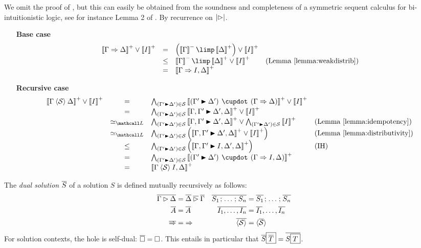 We omit the proof of , but this can easily be obtained from the
soundness and completeness of a symmetric sequent calculus for bi-intuitionistic
logic, see for instance Lemma 2 of .
By recurrence on $\left|\mathbin{\rhd}\right|$.
\begin{itemize}
  \item[\textbf{Base case}]
  $$
  \begin{array}{rcll}
    \psint{\Gamma \seq \Delta} \lor \psint{I}
    &=& \left(\nsint{\Gamma} \limp \psint{\Delta}\right) \lor \psint{I} & \\
    &\sement& \nsint{\Gamma} \limp \psint{\Delta} \lor \psint{I} &\text{(\reflemma{weakdistrib})} \\
    &=& \psint{\Gamma \seq I, \Delta} & \\
  \end{array}
  $$
  \item[\textbf{Recursive case}]
  $$
  \begin{array}{rcll}
    \psint{\Gamma \piq{\cS} \Delta} \lor \psint{I}
    &=& \psintAndMix{(\Gamma' \JB \Delta')}{\cS}{\Gamma}{\Delta} \lor \psint{I} & \\
    &=& \psintAnd{(\Gamma' \JB \Delta')}{\cS}{\Gamma, \Gamma' \JB \Delta', \Delta} \lor \psint{I} & \\
    &\semequiv_{\Lattice}& \psintAnd{(\Gamma' \JB \Delta')}{\cS}{\Gamma, \Gamma' \JB \Delta', \Delta} \lor \psintAnd{(\Gamma' \JB \Delta')}{\cS}{I} &\text{(\reflemma{idempotency})} \\
    &\semequiv_{\Lattice}& \bigwedge_{(\Gamma' \JB \Delta') \in \cS}{\left(\psint{\Gamma, \Gamma' \JB \Delta', \Delta} \lor \psint{I}\right)} &\text{(\reflemma{distributivity})} \\
    &\sement& \bigwedge_{(\Gamma' \JB \Delta') \in \cS}{\left(\psint{\Gamma, \Gamma' \JB I, \Delta', \Delta} \right)} &\text{(IH)} \\
    &=& \psintAndMix{(\Gamma' \JB \Delta')}{\cS}{\Gamma}{I, \Delta} & \\
    &=& \psint{\Gamma \piq{\cS} I, \Delta} & \\
  \end{array}
  $$
\end{itemize}
\begin{definition}
  The \emph{dual solution} $\overline{S}$ of a solution $S$ is defined
  mutually recursively as follows:
  \begin{align*}
    \soldual{\Gamma \J \Delta} &= \soldual{\Delta} \mathbin{\soldual{\J}} \soldual{\Gamma} &
    \soldual{S_1 \sep \ldots \sep S_n} &= \soldual{S_1} \sep \ldots \sep \soldual{S_n} \\
    \soldual{A} &= \soldual{A} &
    \soldual{I_1, \ldots, I_n} &= \soldual{I_1}, \ldots, \soldual{I_n} \\
    \soldual{\seq} &= {\seq} &
    \soldual{\piq{\cS}} &= \piq{\soldual{\cS}}
  \end{align*}
  For solution contexts, the hole is self-dual: $\overline{\square} = \square$. This
  entails in particular that $\overline{S}\fbox{$\overline{T}$} =
  \overline{S\fbox{$T$}}$.
\end{definition}

